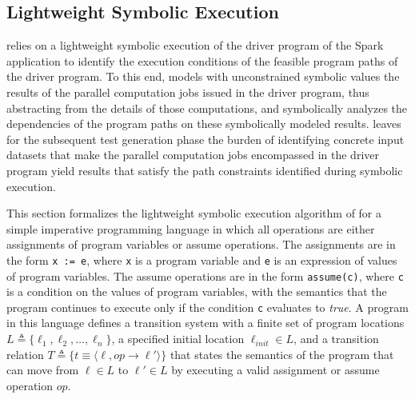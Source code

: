 \subsection{Lightweight Symbolic Execution}\label{sec:lightweight_symbolic_execution}
\approach relies on a lightweight symbolic execution of the driver program of the Spark application to identify the execution conditions of the feasible program paths of the driver program. To this end, \approach
models with unconstrained symbolic values the results of the parallel computation jobs issued in the driver program, 
thus abstracting from the details of those computations, and symbolically  analyzes the dependencies of the program paths on these symbolically modeled results.
\approach leaves for the subsequent test generation phase the burden of identifying concrete input datasets that make the parallel computation jobs encompassed in the driver program yield results that satisfy the path constraints identified during symbolic execution.

This section formalizes the lightweight symbolic execution algorithm of \approach for a simple imperative programming language in which all operations are either assignments of program variables or assume operations. The assignments are in the form \texttt{x := e}, where \texttt{x} is a program variable and \texttt{e} is an expression of values of program variables. The assume operations are in the form \texttt{assume(c)}, where \texttt{c} is a condition on the values of program variables, with the semantics that the program continues to execute only if the condition \texttt{c} evaluates to \emph{true}. 
A program in this language defines a transition system with a finite set of program locations $L \triangleq \{\ell_1, \ell_2, \dots, \ell_n\}$, a specified initial location $\ell_{init} \in L$, and a transition relation $T \triangleq \{t  \equiv \langle\ell, op \rightarrow \ell'\rangle\}$ that states the semantics of the program that can move from $\ell\in L$ to $\ell'\in L$ by executing a valid assignment or assume  operation $op$.

